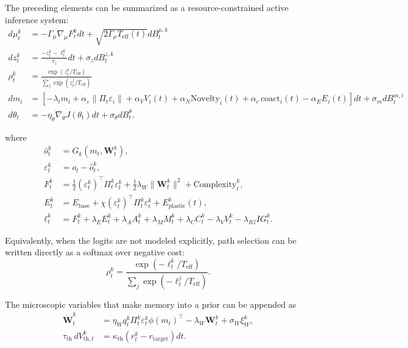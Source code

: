 \documentclass[11pt, a4paper]{article}
\begin{document}
The preceding elements can be summarized as a resource-constrained active inference system:
\begin{equation}
\begin{aligned}
d\mu_t^k
&=
-\Gamma_\mu\nabla_\mu F_t^kdt
+
\sqrt{2\Gamma_\mu T_{\text{eff}}(t)}
dB_t^{\mu,k}
\\
dz_t^k
&=
\frac{-z_t^k-\ell_t^k}{\tau_z}dt
+
\sigma_z dB_t^{z,k}
\\
\rho_t^k
&=
\frac{\exp(z_t^k/T_{\mathrm{eff}})}{\sum_j\exp(z_t^j/T_{\mathrm{eff}})}
\\
dm_i
&=
\left[
-\lambda_i m_i
+
\alpha_\varepsilon\lVert\Pi_t\varepsilon_i\rVert
+
\alpha_VV_i(t)
+
\alpha_N\mathrm{Novelty}_i(t)
+
\alpha_c\,\mathrm{coact}_i(t)
-
\alpha_EE_i(t)
\right]dt
+
\sigma_m dB_t^{m,i}
\\
d\theta_t
&=
-\eta_\theta\nabla_\theta J(\theta_t)dt
+
\sigma_\theta dB_t^\theta .
\end{aligned}
\end{equation}

where
\begin{align}
\hat o_t^k
&=
G_k(m_t,\mathbf W_t^k), \\
\varepsilon_t^k
&=
o_t-\hat o_t^k, \\
F_t^k
&=
\frac{1}{2}(\varepsilon_t^k)^\top\Pi_t^k\varepsilon_t^k
+
\frac{1}{2}\lambda_W\lVert\mathbf W_t^k\rVert^2
+
\mathrm{Complexity}_t^k, \\
E_t^k
&=
E_{\mathrm{base}}
+
\chi(\varepsilon_t^k)^\top\Pi_t^k\varepsilon_t^k
+
E_{\mathrm{plastic}}^k(t), \\
\ell_t^k
&=
F_t^k
+
\lambda_EE_t^k
+
\lambda_AA_t^k
+
\lambda_MM_t^k
+
\lambda_CC_t^k
-
\lambda_VV_t^k
-
\lambda_{IG}IG_t^k.
\end{align}

Equivalently, when the logits are not modeled explicitly, path selection can be written directly as a softmax over negative cost:
\begin{equation}
\rho_t^k
=
\frac{\exp(-\ell_t^k/T_{\mathrm{eff}})}
{\sum_j\exp(-\ell_t^j/T_{\mathrm{eff}})}.
\end{equation}

The microscopic variables that make memory into a prior can be appended as
\begin{align}
\dot{\mathbf W}_t^k
&=
\eta_W q_t^k\Pi_t^k\varepsilon_t^k\phi(m_t)^\top
-
\lambda_W\mathbf W_t^k
+
\sigma_W\xi_W^k, \\
\tau_{\mathrm{th}}\,dV_{\mathrm{th},t}^k
&=
\kappa_{\mathrm{th}}
\left(
r_t^k-r_{\mathrm{target}}
\right)dt.
\end{align}
\end{document}
